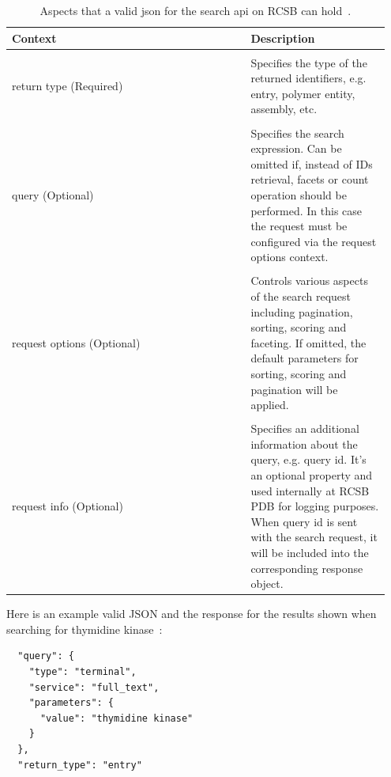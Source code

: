 \documentclass[]{final_report}
\begin{document}
\begin{table}[ht!]
    \begin{center}
        \label{tab:json}
        \begin{tabular}{p{0.6\linewidth}|p{0.35\linewidth}}
            Context & Description\\
            \hline
            \\
            return type (Required) & Specifies the type of the returned identifiers, e.g. entry, polymer entity, assembly, etc.
            \\
            \hline
            \\
            query (Optional) & Specifies the search expression. Can be omitted if, instead of IDs retrieval, facets or count operation should be performed. In this case the request must be configured via the request options context.
            \\
            \hline
            \\
            request options (Optional) & Controls various aspects of the search request including pagination, sorting, scoring and faceting. If omitted, the default parameters for sorting, scoring and pagination will be applied.
            \\
            \hline
            \\
            request info (Optional) & Specifies an additional information about the query, e.g. query id. It's an optional property and used internally at RCSB PDB for logging purposes. When query id is sent with the search request, it will be included into the corresponding response object.
        \end{tabular}
        \caption{\label{json}Aspects that a valid json for the search api on RCSB can hold~\cite{burley_rcsb_2019}\cite{rose_rcsb_2021}.}
    \end{center}
\end{table}

\clearpage

Here is an example valid JSON and the response for the results shown when searching for thymidine kinase~\cite{burley_rcsb_2019}\cite{rose_rcsb_2021}:

\begin{lstlisting}
  "query": {
    "type": "terminal",
    "service": "full_text",
    "parameters": {
      "value": "thymidine kinase"
    }
  },
  "return_type": "entry"
\end{lstlisting}

\vspace{40px}
\end{document}
